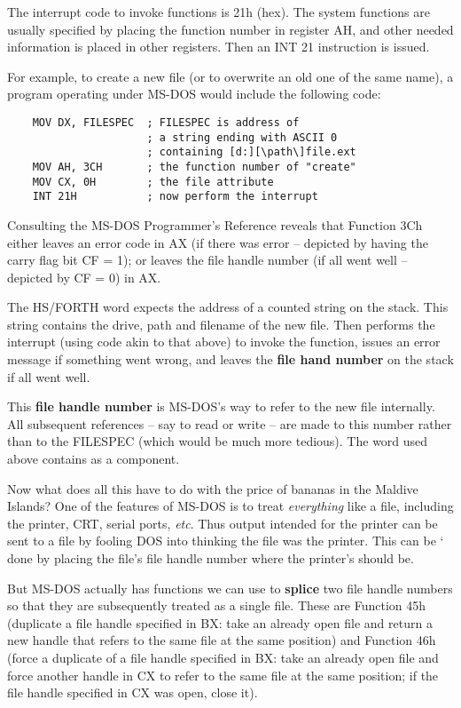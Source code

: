 The interrupt code to invoke functions is 21h (hex).
The system functions are usually specified by placing the function number in register AH, and other needed information is placed in other registers. Then an INT 21 instruction is issued.

For example, to create a new file (or to overwrite an old one of the same name), a program operating under MS-DOS would include the following code:

\begin{lstlisting}
    MOV DX, FILESPEC  ; FILESPEC is address of
                      ; a string ending with ASCII 0
                      ; containing [d:][\path\]file.ext
    MOV AH, 3CH       ; the function number of "create"
    MOV CX, 0H        ; the file attribute
    INT 21H           ; now perform the interrupt
\end{lstlisting}

Consulting the MS-DOS Programmer's Reference reveals that Function 3Ch either leaves an error code in AX (if there was error -- depicted by having the carry flag bit CF = 1); or leaves the file handle number (if all went well -- depicted by CF = 0) in AX.

The HS/FORTH word  expects the address of a counted string on the stack. This string contains the drive, path and filename of the new file. Then  performs the interrupt (using code akin to that above) to invoke the function, issues an error message if something went wrong, and leaves the \textbf{file hand number} on the stack if all went well.

This \textbf{file handle number} is MS-DOS's way to refer to the new file internally. All subsequent references -- say to read or write -- are made to this number rather than to the FILESPEC (which would be much more tedious). The word  used above contains  as a component.

Now what does all this have to do with the price of bananas in the Maldive Islands? One of the features of MS-DOS is to treat \textit{everything} like a file, including the printer, CRT, serial ports, \textit{etc}. Thus output intended for the printer can be sent to a file by fooling DOS into thinking the file was the printer. This can be ‘ done by placing the file’s file handle number where the printer’s should be.

But MS-DOS actually has functions we can use to \textbf{splice} two file handle numbers so that they are subsequently treated as a single file. These are Function 45h (duplicate a file handle specified in BX: take an already open file and return a new handle that refers to the same file at the same position) and Function 46h (force a duplicate of a file handle specified in BX: take an already open file and force another handle in CX to refer to the same file at the same position; if the file handle specified in CX was open, close it).

